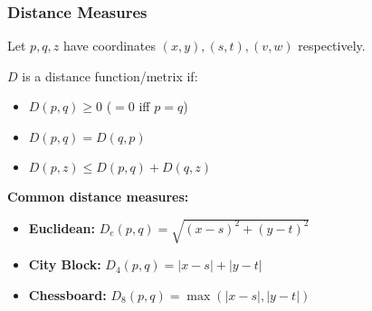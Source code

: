 \subsubsection*{Distance Measures}

Let $p, q, z$ have coordinates $(x, y), (s, t), (v, w)$ respectively.

$D$ is a distance function/metrix if:

\begin{itemize}
  \item $D(p, q) \geq 0$ ($= 0$ iff $p = q$)
  \item $D(p, q) = D(q, p)$
  \item $D(p, z) \leq D(p, q) + D(q, z)$
\end{itemize}

\textbf{Common distance measures:}

\begin{itemize}
  \item \textbf{Euclidean:} $D_e(p, q) = \sqrt{(x - s)^2 + (y - t)^2}$
  \item \textbf{City Block:} $D_4(p, q) = |x - s| + |y - t|$
  \item \textbf{Chessboard:} $D_8(p, q) = \max(|x - s|, |y - t|)$
\end{itemize}

